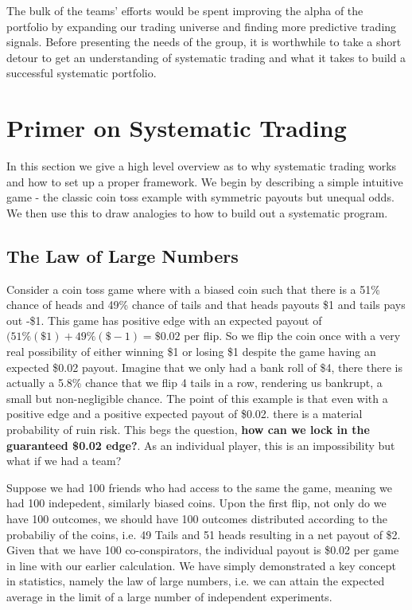 \documentclass{article}
\begin{document}
The bulk of the teams' efforts would be spent improving the alpha of the portfolio by expanding our trading universe and finding more predictive trading signals. Before presenting the needs of the group, it is worthwhile to take a short detour to get an understanding of systematic trading and what it takes to build a successful systematic portfolio.

\section{Primer on Systematic Trading}

In this section we give a high level overview as to why systematic trading works and how to set up a proper framework. We begin by describing a simple intuitive game - the classic coin toss example with symmetric payouts but unequal odds. We then use this to draw analogies to how to build out a systematic program.

\subsection{The Law of Large Numbers}
Consider a coin toss game where with a biased coin such that there is a 51\% chance of heads and 49\% chance of tails and that heads payouts \$1 and tails  pays out  -\$1. This game has positive edge with an expected payout of $(51\%(\$1) + 49\%(\$-1) = \$0.02$ per flip. So we flip the coin once with a very real possibility of either winning \$1 or losing \$1 despite the game having an expected \$0.02 payout. Imagine that we only had a bank roll of \$4, there there is actually a 5.8\% chance that we flip 4 tails in a row, rendering us bankrupt, a small but non-negligible chance. The point of this example is that even with a positive edge and a positive expected payout of \$0.02. there is a material probability of ruin risk. This begs the question, \textbf{how can we lock in the guaranteed \$0.02 edge?}. As an individual player, this is an impossibility but what if we had a team?

Suppose we had 100 friends who had access to the same the game, meaning we had 100 indepedent, similarly biased coins. Upon the first flip, not only do we have 100 outcomes, we should have 100 outcomes distributed according to the probabiliy of the coins, i.e. 49 Tails and 51 heads resulting in a net payout of \$2.  Given that we have 100 co-conspirators, the individual payout is \$0.02 per game in line with our earlier calculation. We have simply demonstrated a key concept in statistics, namely the law of large numbers, i.e. we can attain the expected average in the limit of a large number of independent experiments. 
\end{document}
